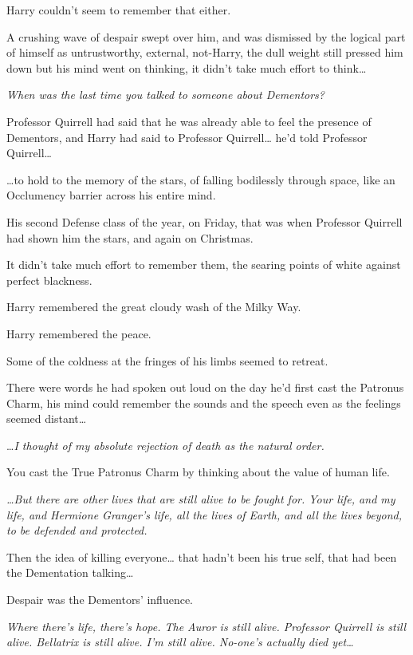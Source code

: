 Harry couldn't seem to remember that either.

A crushing wave of despair swept over him, and was dismissed by the logical part of himself as untrustworthy, external, not-Harry, the dull weight still pressed him down but his mind went on thinking, it didn't take much effort to think{\ldots}

\emph{When was the last time you talked to someone about Dementors?}

Professor Quirrell had said that he was already able to feel the presence of Dementors, and Harry had said to Professor Quirrell{\ldots} he'd told Professor Quirrell{\ldots}

{\ldots}to hold to the memory of the stars, of falling bodilessly through space, like an Occlumency barrier across his entire mind.

His second Defense class of the year, on Friday, that was when Professor Quirrell had shown him the stars, and again on Christmas.

It didn't take much effort to remember them, the searing points of white against perfect blackness.

Harry remembered the great cloudy wash of the Milky Way.

Harry remembered the peace.

Some of the coldness at the fringes of his limbs seemed to retreat.

There were words he had spoken out loud on the day he'd first cast the Patronus Charm, his mind could remember the sounds and the speech even as the feelings seemed distant{\ldots}

{\ldots}\emph{I thought of my absolute rejection of death as the natural order.}

You cast the True Patronus Charm by thinking about the value of human life.

\emph{{\ldots}But there are other lives that are still alive to be fought for. Your life, and my life, and Hermione Granger's life, all the lives of Earth, and all the lives beyond, to be defended and protected.}

Then the idea of killing everyone{\ldots} that hadn't been his true self, that had been the Dementation talking{\ldots}

Despair was the Dementors' influence.

\emph{Where there's life, there's hope. The Auror is still alive. Professor Quirrell is still alive. Bellatrix is still alive. I'm still alive. No-one's actually died yet{\ldots}}

